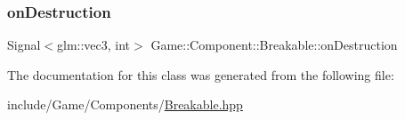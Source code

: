 \subsubsection{\texorpdfstring{on\+Destruction}{onDestruction}}
{\footnotesize\ttfamily Signal$<$glm\+::vec3, int$>$ Game\+::\+Component\+::\+Breakable\+::on\+Destruction}



The documentation for this class was generated from the following file\+:\begin{DoxyCompactItemize}
\item 
include/\+Game/\+Components/\mbox{\hyperlink{_breakable_8hpp}{Breakable.\+hpp}}\end{DoxyCompactItemize}
